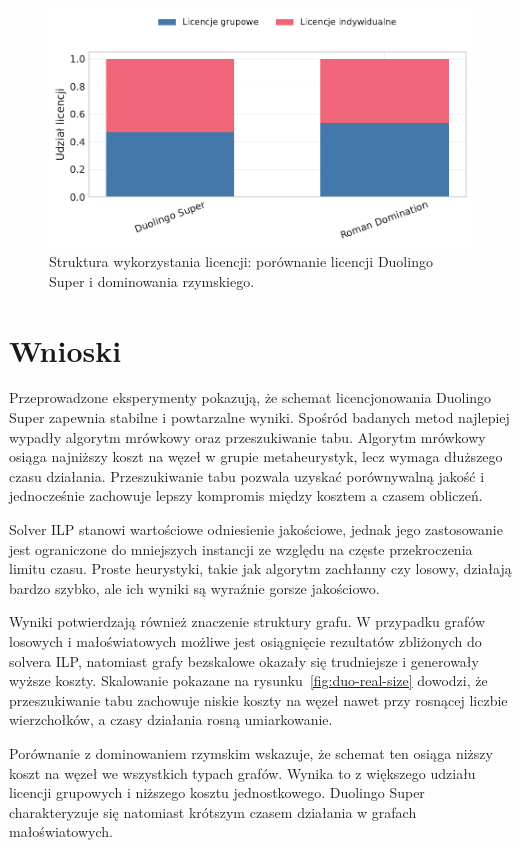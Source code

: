 \begin{figure}[H]
  \centering
  \includegraphics[width=0.6\linewidth]{assets/figures/benchmark/synthetic/license_mix_duo_vs_roman.pdf}
  \caption{Struktura wykorzystania licencji: porównanie licencji Duolingo Super i dominowania rzymskiego.}
  \label{fig:duo-roman-license}
\end{figure}

\section{Wnioski}

Przeprowadzone eksperymenty pokazują, że schemat licencjonowania Duolingo Super zapewnia stabilne i powtarzalne wyniki. Spośród badanych metod najlepiej wypadły algorytm mrówkowy oraz przeszukiwanie tabu. Algorytm mrówkowy osiąga najniższy koszt na węzeł w grupie metaheurystyk, lecz wymaga dłuższego czasu działania. Przeszukiwanie tabu pozwala uzyskać porównywalną jakość i jednocześnie zachowuje lepszy kompromis między kosztem a czasem obliczeń.

Solver ILP stanowi wartościowe odniesienie jakościowe, jednak jego zastosowanie jest ograniczone do mniejszych instancji ze względu na częste przekroczenia limitu czasu. Proste heurystyki, takie jak algorytm zachłanny czy losowy, działają bardzo szybko, ale ich wyniki są wyraźnie gorsze jakościowo.

Wyniki potwierdzają również znaczenie struktury grafu. W przypadku grafów losowych i małoświatowych możliwe jest osiągnięcie rezultatów zbliżonych do solvera ILP, natomiast grafy bezskalowe okazały się trudniejsze i generowały wyższe koszty. Skalowanie pokazane na rysunku~\ref{fig:duo-real-size} dowodzi, że przeszukiwanie tabu zachowuje niskie koszty na węzeł nawet przy rosnącej liczbie wierzchołków, a czasy działania rosną umiarkowanie.

Porównanie z dominowaniem rzymskim wskazuje, że schemat ten osiąga niższy koszt na węzeł we wszystkich typach grafów. Wynika to z większego udziału licencji grupowych i niższego kosztu jednostkowego. Duolingo Super charakteryzuje się natomiast krótszym czasem działania w grafach małoświatowych.
